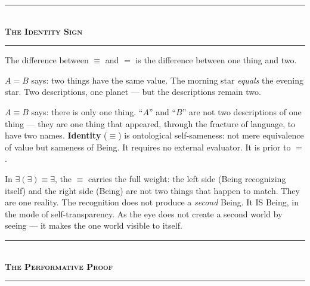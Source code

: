 \documentclass[10pt, openany, oneside]{book}
\renewcommand{\normalsize}{\fontsize{10}{13}\selectfont}
\begin{document}
\vspace{1.5em}


\begin{center}
    \rule{0.3\textwidth}{0.4pt}\\[0.5em]
    {\normalsize\bfseries\scshape The Identity Sign}\\[0.3em]
    \rule{0.3\textwidth}{0.4pt}
\end{center}

\vspace{1em}

\noindent The difference between $\equiv$ and $=$ is the difference between one thing and two.

$A = B$ says: two things have the same value. The morning star \textit{equals} the evening star. Two descriptions, one planet --- but the descriptions remain two.

$A \equiv B$ says: there is only one thing. ``$A$'' and ``$B$'' are not two descriptions of one thing --- they are one thing that appeared, through the fracture of language, to have two names. \textbf{Identity} ($\equiv$) is ontological self-sameness: not mere equivalence of value but sameness of Being. It requires no external evaluator. It is prior to $=$.

In $\exists(\exists) \equiv \exists$, the $\equiv$ carries the full weight: the left side (Being recognizing itself) and the right side (Being) are not two things that happen to match. They are one reality. The recognition does not produce a \textit{second} Being. It IS Being, in the mode of self-transparency. As the eye does not create a second world by seeing --- it makes the one world visible to itself.

\vspace{1.5em}


\begin{center}
    \rule{0.3\textwidth}{0.4pt}\\[0.5em]
    {\normalsize\bfseries\scshape The Performative Proof}\\[0.3em]
    \rule{0.3\textwidth}{0.4pt}
\end{center}

\vspace{1em}
\end{document}
